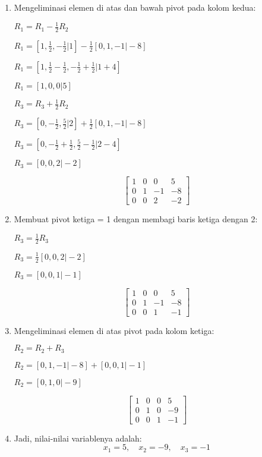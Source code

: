 \documentclass[a4paper]{article}
\begin{document}
\begin{enumerate}[itemsep=1em,leftmargin=*]
\begin{enumerate}
\begin{enumerate}
      \item Mengeliminasi elemen di atas dan bawah pivot pada kolom kedua:
      
      \(R_1 = R_1 - \frac{1}{2}R_2\)

      \(R_1 = [1, \frac{1}{2}, -\frac{1}{2} \vert 1] - \frac{1}{2}[0, 1, -1 \vert -8]\)

      \(R_1 = [1, \frac{1}{2} - \frac{1}{2}, -\frac{1}{2} + \frac{1}{2} \vert 1 + 4]\)

      \(R_1 = [1, 0, 0 \vert 5]\)

      \vspace{1em}

      \(R_3 = R_3 + \frac{1}{2}R_2\)

      \(R_3 = [0, -\frac{1}{2}, \frac{5}{2} \vert 2] + \frac{1}{2}[0, 1, -1 \vert -8]\)

      \(R_3 = [0, -\frac{1}{2} + \frac{1}{2}, \frac{5}{2} - \frac{1}{2} \vert 2 - 4]\)

      \(R_3 = [0, 0, 2 \vert -2]\)

      \[
      \left[\begin{array}{ccc|c}
      1 & 0 & 0 & 5 \\
      0 & 1 & -1 & -8 \\
      0 & 0 & 2 & -2
      \end{array}\right]
      \]
      \item Membuat pivot ketiga = 1 dengan membagi baris ketiga dengan 2:
      
      \(R_3 = \frac{1}{2}R_3\)

      \(R_3 = \frac{1}{2}[0, 0, 2 \vert -2]\)

      \(R_3 = [0, 0, 1 \vert -1]\)

      \[
      \left[\begin{array}{ccc|c}
      1 & 0 & 0 & 5 \\
      0 & 1 & -1 & -8 \\
      0 & 0 & 1 & -1
      \end{array}\right]
      \]
      \item Mengeliminasi elemen di atas pivot pada kolom ketiga:
      
      \(R_2 = R_2 + R_3\)

      \(R_2 = [0, 1, -1 \vert -8] + [0, 0, 1 \vert -1]\)

      \(R_2 = [0, 1, 0 \vert -9]\)

      \[
      \left[\begin{array}{ccc|c}
      1 & 0 & 0 & 5 \\
      0 & 1 & 0 & -9 \\
      0 & 0 & 1 & -1
      \end{array}\right]
      \]

      \item Jadi, nilai-nilai variablenya adalah:
      \[x_1 = 5, \quad x_2 = -9, \quad x_3 = -1\]
    \end{enumerate}
  \end{enumerate}
\end{enumerate}
\end{document}
